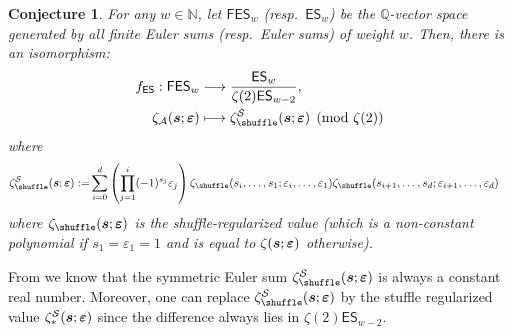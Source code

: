 \documentclass{article}
\newcommand{\FES}{\mathsf {FES}}
\newcommand{\ES}{\mathsf {ES}}
\newcommand{\sha}{\shuffle}
\newcommand{\Sy}{{\mathcal S}}
\newcommand\eps{{\varepsilon}}
\newcommand{\bfs}{{\boldsymbol{\sl{s}}}}
\newcommand\bfeps{{\boldsymbol \varepsilon}}
\newcommand{\calA}{\mathcal{A}}
\newcommand{\N}{\mathbb{N}}
\newcommand{\Q}{\mathbb{Q}}
\theoremstyle{plain}
\newtheorem{conj}[thm]{Conjecture}
\theoremstyle{definition}
\begin{document}
\begin{conj}\label{conj:KanekoZagierAltVersion}
For any $w\in\N$, let $\FES_{w}$ (resp.\ $\ES_w$) be the $\Q$-vector space generated by
all finite Euler sums (resp.\ Euler sums) of weight $w$. Then, there is an isomorphism:
\begin{align*}
f_\ES: \FES_{w} & \longrightarrow \frac{\ES_w}{\zeta(2)\ES_{w-2}} , \\
 \zeta_{\calA}(\bfs;\bfeps) & \longmapsto \zeta_\sha^\Sy(\bfs;\bfeps)  \pmod{\zeta(2)}
\end{align*}
where
\begin{align*}
\zeta_\sha^\Sy(\bfs;\bfeps):=&\sum_{i=0}^d
\left(\prod_{j=1}^i (-1)^{s_j} \eps_j \right) \zeta_\sha(s_i,\dots,s_1;\eps_i,\dots,\eps_1) \zeta_\sha(s_{i+1},\dots,s_d;\eps_{i+1},\dots,\eps_d)
\end{align*}
where $\zeta_\sha(\bfs;\bfeps)$ is the shuffle-regularized value (which is a non-constant polynomial if $s_1=\eps_1=1$ and is equal to $\zeta(\bfs;\bfeps)$ otherwise).
\end{conj}
From \cite[Prop. 8.6.8]{Zhao2016} we know that the symmetric Euler sum $\zeta_\sha^\Sy(\bfs;\bfeps)$ is always a constant real number. Moreover,
one can replace $\zeta_\sha^\Sy(\bfs;\bfeps)$ by the stuffle regularized value $\zeta_\ast^\Sy(\bfs;\bfeps)$
since the difference always lies in $\zeta(2)\ES_{w-2}$.
\end{document}
